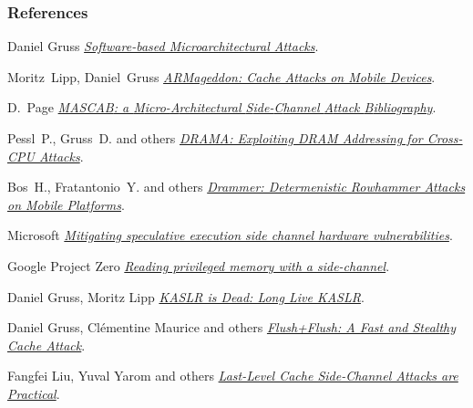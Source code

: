 \begin{frame}[allowframebreaks]
  \frametitle<presentation>{References}
  \begin{thebibliography}{10}
    \beamertemplatebookbibitems


    Daniel Gruss
    \newblock \href{https://gruss.cc/files/phd_thesis.pdf}{\em Software-based Microarchitectural Attacks}.

    Moritz~Lipp, Daniel~Gruss
    \newblock \href{https://www.blackhat.com/docs/eu-16/materials/eu-16-Lipp-ARMageddon-How-Your-Smartphone-CPU-Breaks-Software-Level-Security-And-Privacy-wp.pdf}{\em ARMageddon: Cache Attacks on Mobile Devices}.

    D.~Page
    \newblock \href{http://www.github.com/danpage/mascab}{\em {MASCAB}: a {M}icro-{A}rchitectural {S}ide-{C}hannel {A}ttack {B}ibliography}.

    Pessl~P., Gruss~D. and others
    \newblock \href{https://www.blackhat.com/docs/eu-16/materials/eu-16-Schwarz-How-Your-DRAM-Becomes-A-Security-Problem-wp.pdf}{\em DRAMA: Exploiting DRAM Addressing for Cross-CPU Attacks}.
    
    Bos~H., Fratantonio~Y. and others
    \newblock \href{https://gruss.cc/files/drammer.pdf}{\em Drammer: Determenistic Rowhammer Attacks on Mobile Platforms}.

    Microsoft
    \newblock \href{https://blogs.technet.microsoft.com/srd/2018/03/15/mitigating-speculative-execution-side-channel-hardware-vulnerabilities/}{\em Mitigating speculative execution side channel hardware vulnerabilities}.

    Google Project Zero
    \newblock \href{https://googleprojectzero.blogspot.com/2018/01/reading-privileged-memory-with-side.html}{\em Reading privileged memory with a side-channel}.

    Daniel Gruss, Moritz Lipp
    \newblock \href{https://gruss.cc/files/kaiser.pdf}{\em KASLR is Dead: Long Live KASLR}.

    Daniel Gruss, Clémentine Maurice and others
    \newblock \href{https://arxiv.org/abs/1511.04594}{\em Flush+Flush: A Fast and Stealthy Cache Attack}.

    Fangfei Liu, Yuval Yarom and others
    \newblock \href{http://palms.ee.princeton.edu/system/files/SP_vfinal.pdf}{\em Last-Level Cache Side-Channel Attacks are Practical}.


\end{thebibliography}
\end{frame}
